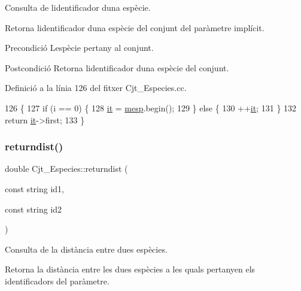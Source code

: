 Consulta de l\textquotesingle{}identificador d\textquotesingle{}una espècie. 

Retorna l\textquotesingle{}identificador d\textquotesingle{}una espècie del conjunt del paràmetre implícit.

\begin{DoxyPrecond}{Precondició}
L\textquotesingle{}espècie pertany al conjunt. 
\end{DoxyPrecond}
\begin{DoxyPostcond}{Postcondició}
Retorna l\textquotesingle{}identificador d\textquotesingle{}una espècie del conjunt. 
\end{DoxyPostcond}


Definició a la línia 126 del fitxer Cjt\+\_\+\+Especies.\+cc.


\begin{DoxyCode}
126                                    \{
127     \textcolor{keywordflow}{if} (i == 0) \{
128         \hyperlink{class_cjt___especies_a25b19415a21bdabe9e2fc2ad7d2f68a5}{it} = \hyperlink{class_cjt___especies_a64a525b38c78935e7432b362ea9a2306}{mesp}.begin();
129     \} \textcolor{keywordflow}{else} \{
130         ++\hyperlink{class_cjt___especies_a25b19415a21bdabe9e2fc2ad7d2f68a5}{it};
131     \}
132     \textcolor{keywordflow}{return} \hyperlink{class_cjt___especies_a25b19415a21bdabe9e2fc2ad7d2f68a5}{it}->first;
133 \}
\end{DoxyCode}
\mbox{\label{class_cjt___especies_ae13d0a3a9f8b0ed9bba78b1c6c9d4eaa}} 
\subsubsection{\texorpdfstring{returndist()}{returndist()}}
{\footnotesize\ttfamily double Cjt\+\_\+\+Especies\+::returndist (\begin{DoxyParamCaption}\item[{const string}]{id1,  }\item[{const string}]{id2 }\end{DoxyParamCaption})}



Consulta de la distància entre dues espècies. 

Retorna la distància entre les dues espècies a les quals pertanyen els identificadors del paràmetre.

